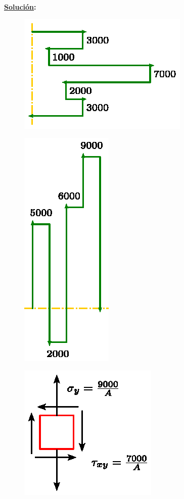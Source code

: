 \documentclass[letter,10pt,twoside]{article}
\begin{document}
\textbf{\underline{Solución}:} \\

\begin{figure}[H]
\centering
\includegraphics[scale=1.25]{resources/f85.eps}
\end{figure}

\begin{figure}[H]
\centering
\includegraphics[scale=1.25]{resources/f86.eps}
\end{figure}

\begin{figure}[H]
\centering
\includegraphics[scale=1.2]{resources/f80.eps}
\end{figure}
\end{document}
